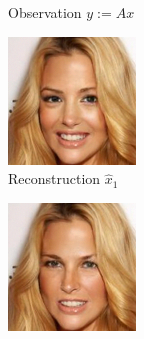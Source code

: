 \begin{figure}
\begin{subfigure}{.135\textwidth}
        \caption{\scriptsize Observation $y := Ax$}
    \end{subfigure}
    \begin{subfigure}{.135\textwidth}
        \includegraphics[width=\textwidth]{Chapter2/samples/diversity/1.png}
        \caption{\scriptsize Reconstruction $\hat{x}_1$}
    \end{subfigure} 
    \begin{subfigure}{.135\textwidth}
        \includegraphics[width=\textwidth]{Chapter2/samples/diversity/2.png}

\end{subfigure}
\end{figure}
